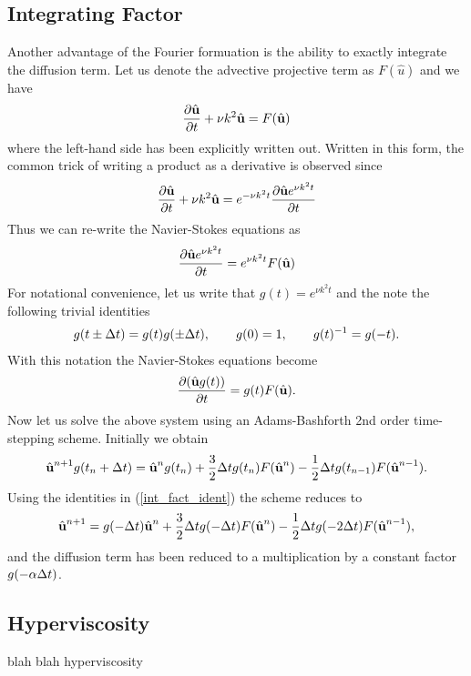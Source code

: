 \subsection{Integrating Factor}
Another advantage of the Fourier formuation is the ability to exactly integrate the diffusion term. Let us denote the advective projective term as $F(\hat{u})$ and we have
\begin{align}
\frac{\partial \hat{\textbf{u}}}{\partial t} + \nu k^{2}\hat{\textbf{u}} = F(\hat{\textbf{u}}) 
\end{align}
where the left-hand side has been explicitly written out. Written in this form, the common trick of writing a product as a derivative is observed since
\begin{align}
 \frac{\partial \hat{\textbf{u}}}{\partial t} + \nu k^{2}\hat{\textbf{u}}= e^{-\nu k^{2}t}\frac{\partial \hat{\textbf{u}} e^{\nu k^{2}t}}{\partial t} 
\end{align}
Thus we can re-write the Navier-Stokes equations as 
\begin{align}
\frac{\partial \hat{\textbf{u}} e^{\nu k^{2}t}}{\partial t} = e^{\nu k^{2}t}F(\hat{\textbf{u}})
\end{align}
For notational convenience, let us write that $g(t) = e^{\nu k^{2}t}$ and the note the following trivial identities
\begin{align}
g(t\pm\Delta t) = g(t)g(\pm\Delta t),\qquad g(0) = 1, \qquad g(t)^{-1} = g(-t).\label{int_fact_ident}
\end{align}
With this notation the Navier-Stokes equations become
\begin{align}
\frac{\partial (\hat{\textbf{u}} g(t))}{\partial t} = g(t)F(\hat{\textbf{u}}).
\end{align}
 Now let us solve the above system using an Adams-Bashforth 2nd order time-stepping scheme. Initially we obtain
\begin{align}
\hat{\textbf{u}}^{n+1}g(t_{n}+\Delta t) = \hat{\textbf{u}}^{n}g(t_{n}) + \frac{3}{2}\Delta t g(t_{n})F(\hat{\textbf{u}}^{n}) - \frac{1}{2}\Delta t g(t_{n-1})F(\hat{\textbf{u}}^{n-1}).
\end{align}
Using the identities in (\ref{int_fact_ident}) the scheme reduces to
\begin{align}
\hat{\textbf{u}}^{n+1} = g(-\Delta t)\hat{\textbf{u}}^{n} + \frac{3}{2}\Delta t g(-\Delta t)F(\hat{\textbf{u}}^{n}) - \frac{1}{2}\Delta t g(-2\Delta t)F(\hat{\textbf{u}}^{n-1}),
\end{align}
and the diffusion term has been reduced to a multiplication by a constant factor $g(-\alpha\Delta t)$.

\subsection{Hyperviscosity}
blah blah hyperviscosity

